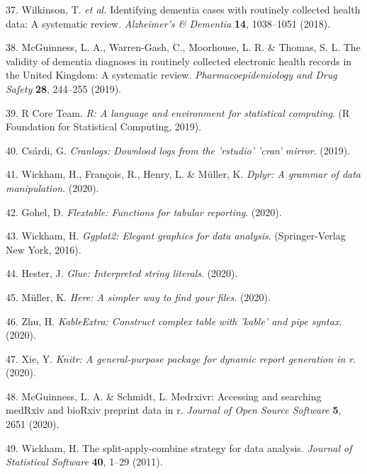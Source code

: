 \documentclass[a4paper, twoside]{templates/ociamthesis}
\begin{document}
\leavevmode\hypertarget{ref-wilkinson2018a}{}%
37. Wilkinson, T. \emph{et al.} Identifying dementia cases with routinely collected health data: A systematic review. \emph{Alzheimer's \& Dementia} \textbf{14}, 1038--1051 (2018).

\leavevmode\hypertarget{ref-mcguinness2019c}{}%
38. McGuinness, L. A., Warren-Gash, C., Moorhouse, L. R. \& Thomas, S. L. The validity of dementia diagnoses in routinely collected electronic health records in the United Kingdom: A systematic review. \emph{Pharmacoepidemiology and Drug Safety} \textbf{28}, 244--255 (2019).

\leavevmode\hypertarget{ref-base}{}%
39. R Core Team. \emph{R: A language and environment for statistical computing}. (R Foundation for Statistical Computing, 2019).

\leavevmode\hypertarget{ref-cranlogs}{}%
40. Csárdi, G. \emph{Cranlogs: Download logs from the 'rstudio' 'cran' mirror}. (2019).

\leavevmode\hypertarget{ref-dplyr}{}%
41. Wickham, H., François, R., Henry, L. \& Müller, K. \emph{Dplyr: A grammar of data manipulation}. (2020).

\leavevmode\hypertarget{ref-flextable}{}%
42. Gohel, D. \emph{Flextable: Functions for tabular reporting}. (2020).

\leavevmode\hypertarget{ref-ggplot2}{}%
43. Wickham, H. \emph{Ggplot2: Elegant graphics for data analysis}. (Springer-Verlag New York, 2016).

\leavevmode\hypertarget{ref-glue}{}%
44. Hester, J. \emph{Glue: Interpreted string literals}. (2020).

\leavevmode\hypertarget{ref-here}{}%
45. Müller, K. \emph{Here: A simpler way to find your files}. (2020).

\leavevmode\hypertarget{ref-kableExtra}{}%
46. Zhu, H. \emph{KableExtra: Construct complex table with 'kable' and pipe syntax}. (2020).

\leavevmode\hypertarget{ref-knitr}{}%
47. Xie, Y. \emph{Knitr: A general-purpose package for dynamic report generation in r}. (2020).

\leavevmode\hypertarget{ref-medrxivr}{}%
48. McGuinness, L. A. \& Schmidt, L. Medrxivr: Accessing and searching medRxiv and bioRxiv preprint data in r. \emph{Journal of Open Source Software} \textbf{5}, 2651 (2020).

\leavevmode\hypertarget{ref-plyr}{}%
49. Wickham, H. The split-apply-combine strategy for data analysis. \emph{Journal of Statistical Software} \textbf{40}, 1--29 (2011).
\end{document}
